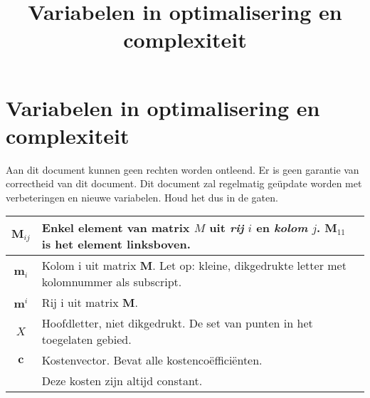 \documentclass[10pt,a4paper]{article}
\title{Variabelen in optimalisering en complexiteit}
\author{}
\date{}
\begin{document}
\section*{Variabelen in optimalisering en complexiteit}

Aan dit document kunnen geen rechten worden ontleend. Er is geen garantie van correctheid van dit document. Dit document zal regelmatig geüpdate worden met verbeteringen en nieuwe variabelen. Houd het dus in de gaten.


\begin{tabular}{|c|l|}
\hline
$\textbf{M}_{ij}$ & Enkel element van matrix $M$ uit \textit{rij} $i$ en \textit{kolom} $j$. $\textbf{M}_{11}$ is het element linksboven.\\
\hline
$\textbf{m}_i$ & Kolom i uit matrix $\textbf{M}$. Let op: kleine, dikgedrukte letter met kolomnummer als subscript. \\
\hline
$\textbf{m}^i$ & Rij i uit matrix $\textbf{M}$. \\
\hline
$X$ & Hoofdletter, niet dikgedrukt. De set van punten in het toegelaten gebied. \\
\hline
$\textbf{c}$ & Kostenvector. Bevat alle kostencoëfficiënten.\\ & Deze kosten zijn altijd constant.\\ 


\end{tabular}
\end{document}
